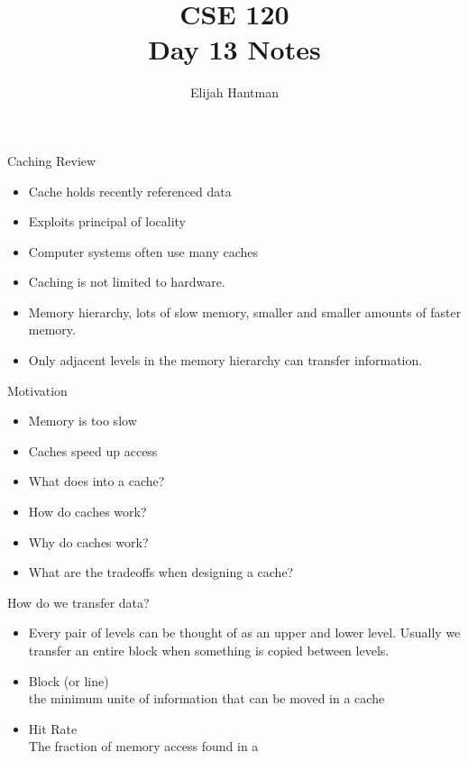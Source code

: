 \documentclass{report}
\title{\Huge{CSE 120}\\Day 13 Notes}
\author{\huge{Elijah Hantman}}
\date{}
\begin{document}
\maketitle
\newpage
\begin{description}
    \item {\large Caching Review} 
        \begin{itemize}
            \item  Cache holds recently referenced data
            \item Exploits principal of locality
            \item Computer systems often use many caches
            \item Caching is not limited to hardware.
            \item Memory hierarchy, lots of slow memory,
                smaller and smaller amounts of faster
                memory.
            \item Only adjacent levels in the memory hierarchy
                can transfer information.
        \end{itemize}
    \item {\large Motivation}
        \begin{itemize}
            \item Memory is too slow
            \item Caches speed up access
            \item What does into a cache?
            \item How do caches work?
            \item Why do caches work?
            \item What are the tradeoffs when designing a cache?
        \end{itemize}
    \item How do we transfer data?
        \begin{itemize}
            \item Every pair of levels can be thought of as
                an upper and lower level. Usually we transfer
                an entire block when something is copied between
                levels.
            \item Block (or line)\\
                the minimum unite of information that can
                be moved in a cache
            \item Hit Rate\\
                The fraction of memory access found in a

\end{itemize}
\end{description}
\end{document}
